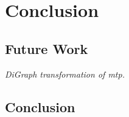 \chapter*{Conclusion}

\section{Future Work}

\textit{DiGraph transformation of \gls{mtp}.}

\section{Conclusion}


